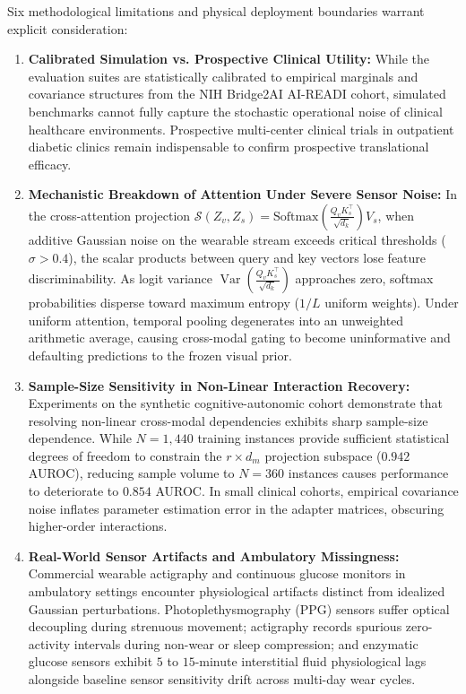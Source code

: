 \documentclass[a4paper,fleqn]{cas-dc}
\begin{document}
Six methodological limitations and physical deployment boundaries warrant explicit consideration:
\begin{enumerate}
    \item \textbf{Calibrated Simulation vs. Prospective Clinical Utility:} While the evaluation suites are statistically calibrated to empirical marginals and covariance structures from the NIH Bridge2AI AI-READI cohort, simulated benchmarks cannot fully capture the stochastic operational noise of clinical healthcare environments. Prospective multi-center clinical trials in outpatient diabetic clinics remain indispensable to confirm prospective translational efficacy.
    \item \textbf{Mechanistic Breakdown of Attention Under Severe Sensor Noise:} In the cross-attention projection $\mathcal{S}(Z_v, Z_s) = \text{Softmax}\left(\frac{Q_v K_s^\top}{\sqrt{d_k}}\right) V_s$, when additive Gaussian noise on the wearable stream exceeds critical thresholds ($\sigma > 0.4$), the scalar products between query and key vectors lose feature discriminability. As logit variance $\operatorname{Var}\left(\frac{Q_v K_s^\top}{\sqrt{d_k}}\right)$ approaches zero, softmax probabilities disperse toward maximum entropy ($1/L$ uniform weights). Under uniform attention, temporal pooling degenerates into an unweighted arithmetic average, causing cross-modal gating to become uninformative and defaulting predictions to the frozen visual prior.
    \item \textbf{Sample-Size Sensitivity in Non-Linear Interaction Recovery:} Experiments on the synthetic cognitive-autonomic cohort demonstrate that resolving non-linear cross-modal dependencies exhibits sharp sample-size dependence. While $N=1{,}440$ training instances provide sufficient statistical degrees of freedom to constrain the $r \times d_m$ projection subspace ($0.942$ AUROC), reducing sample volume to $N=360$ instances causes performance to deteriorate to $0.854$ AUROC. In small clinical cohorts, empirical covariance noise inflates parameter estimation error in the adapter matrices, obscuring higher-order interactions.
    \item \textbf{Real-World Sensor Artifacts and Ambulatory Missingness:} Commercial wearable actigraphy and continuous glucose monitors in ambulatory settings encounter physiological artifacts distinct from idealized Gaussian perturbations. Photoplethysmography (PPG) sensors suffer optical decoupling during strenuous movement; actigraphy records spurious zero-activity intervals during non-wear or sleep compression; and enzymatic glucose sensors exhibit $5$ to $15$-minute interstitial fluid physiological lags alongside baseline sensor sensitivity drift across multi-day wear cycles.

\end{enumerate}
\end{document}
